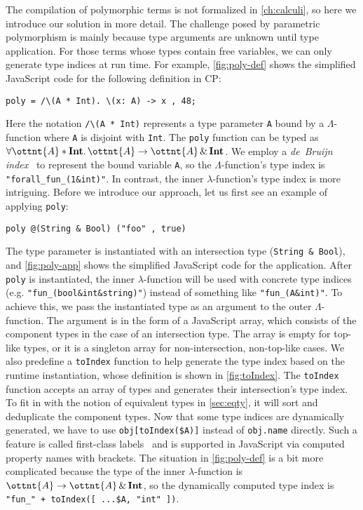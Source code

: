 \noindent
The compilation of polymorphic terms is not formalized in \autoref{ch:calculi},
so here we introduce our solution in more detail. The challenge posed by
parametric polymorphism is mainly because type arguments are unknown until type
application. For those terms whose types contain free variables, we can only
generate type indices at run time. For example, \autoref{fig:poly-def} shows the
simplified JavaScript code for the following definition in CP:
\begin{lstlisting}
poly = /\(A * Int). \(x: A) -> x , 48;
\end{lstlisting}
Here the notation \lstinline{/\(A * Int)} represents a type parameter
\lstinline{A} bound by a $\Lambda$-function where \lstinline{A} is disjoint with
\lstinline{Int}. The \lstinline{poly} function can be typed as
$\forall \ottnt{A}  *   \mathbf{Int} .\, \ottnt{A}  \rightarrow  \ottnt{A}  \, {\&} \,   \mathbf{Int} $. We employ a \emph{de~Bruijn
index}~\citep{de1972lambda} to represent the bound variable \lstinline{A}, so
the $\Lambda$-function's type index is \lstinline{"forall_fun_(1&int)"}. In
contrast, the inner $\lambda$-function's type index is more intriguing. Before
we introduce our approach, let us first see an example of applying
\lstinline{poly}:
\begin{lstlisting}
poly @(String & Bool) ("foo" , true)
\end{lstlisting}
The type parameter is instantiated with an intersection type
(\lstinline{String & Bool}), and \autoref{fig:poly-app} shows the simplified
JavaScript code for the application. After \lstinline{poly} is instantiated, the
inner $\lambda$-function will be used with concrete type indices (e.g.
\lstinline{"fun_(bool&int&string)"}) instead of something like
\lstinline{"fun_(A&int)"}. To achieve this, we pass the instantiated type as an
argument to the outer $\Lambda$-function. The argument is in the form of a
JavaScript array, which consists of the component types in the case of an
intersection type. The array is empty for top-like types, or it is a singleton
array for non-intersection, non-top-like cases. We also predefine a
\lstinline{toIndex} function to help generate the type index based on the
runtime instantiation, whose definition is shown in \autoref{fig:toIndex}. The
\lstinline{toIndex} function accepts an array of types and generates their
intersection's type index. To fit in with the notion of equivalent types in
\autoref{sec:eqty}, it will sort and deduplicate the component types. Now that
some type indices are dynamically generated, we have to use
\lstinline{obj[toIndex($A)]} instead of \lstinline{obj.name} directly. Such a
feature is called first-class labels~\citep{leijen2004first} and is supported in
JavaScript via computed property names with brackets. The situation in
\autoref{fig:poly-def} is a bit more complicated because the type of the inner
$\lambda$-function is $\ottnt{A}  \rightarrow  \ottnt{A}  \, {\&} \,   \mathbf{Int} $, so the dynamically computed type index
is \lstinline{"fun_" + toIndex([ ...$A, "int" ])}.

